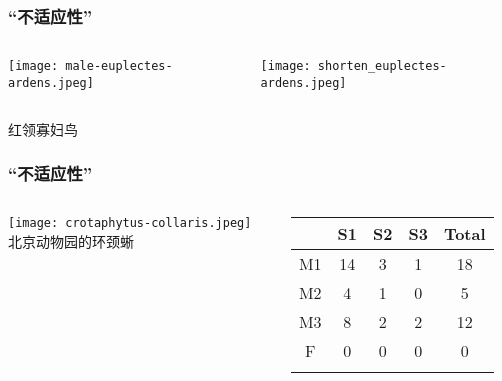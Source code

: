 \documentclass[UTF8,lualatex]{ctexbeamer}
\begin{document}

\begin{frame}
    \frametitle{“不适应性”}
    \begin{columns}
        \begin{column}{.48\textwidth}
            \texttt{[image: male-euplectes-ardens.jpeg]}
        \end{column}
        \begin{column}{.48\textwidth}
            \texttt{[image: shorten\_euplectes-ardens.jpeg]}
        \end{column}
    \end{columns}

    \begin{center}
        红领寡妇鸟
    \end{center}
\end{frame}


\begin{frame}
    \frametitle{“不适应性”}
    \begin{columns}[t]
        \begin{column}{.48\textwidth}
            \texttt{[image: crotaphytus-collaris.jpeg]}
            \\
            北京动物园的环颈蜥
        \end{column}
        \begin{column}{.48\textwidth}
            \begin{tabular}{*{5}{c}}
                \hline
                    & S1  & S2  & S3    & Total \\
                \hline
                M1  & 14  & 3   & 1     & 18 \\
                M2  & 4   & 1   & 0     & 5 \\
                M3  & 8   & 2   & 2     & 12 
                \onslide<2->{
                \\ \hline
                F   & 0   & 0   & 0     & 0
                \\ \hline
                }
            \end{tabular}
        \end{column}
    \end{columns}
\end{frame}
\end{document}
